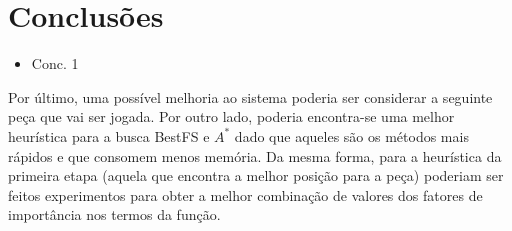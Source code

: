 \section{Conclusões}
	\begin{itemize}
		\item Conc. 1
	\end{itemize}
	Por último, uma possível melhoria ao sistema poderia ser considerar a seguinte peça que vai ser jogada. Por outro lado, poderia encontra-se uma melhor heurística para a busca BestFS e $A^*$ dado que aqueles são os métodos mais rápidos e que consomem menos memória. Da mesma forma, para a heurística da primeira etapa (aquela que encontra a melhor posição para a peça) poderiam ser feitos experimentos para obter a melhor combinação de valores dos fatores de importância nos termos da função.
